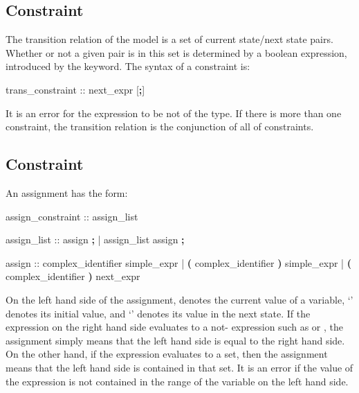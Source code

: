 \subsection{ Constraint}
\label{TRANS Constraint}
%
The transition relation of the model is a set of current state/next
state pairs. 
%
Whether or not a given pair is in this set is determined by a boolean
expression, introduced by the  keyword. 
%
The syntax of a  constraint is:
%
\begin{Grammar}
trans_constraint ::  next_expr [\textbf{;}]
\end{Grammar}
%
It is an error for the expression to be not of the \Boolean type.
%
If there is more than one  constraint, the transition
relation is the conjunction of all of  constraints.

\subsection{ Constraint}
\label{ASSIGN Constraint}
%
An assignment  has the form:
%
\begin{Grammar}
assign_constraint ::  assign_list

assign_list :: assign \textbf{;}
             | assign_list assign \textbf{;}

assign ::
    complex_identifier          \operator{:=} simple_expr
  |  \textbf{(} complex_identifier \textbf{)} \operator{:=} simple_expr
  |  \textbf{(} complex_identifier \textbf{)} \operator{:=} next_expr
\end{Grammar}
%
On the left hand side of the assignment,  denotes
the current value of a variable,
`{}' denotes its
initial value, and
`{}' denotes its
value in the next state.
%
If the expression on the right hand side evaluates to a not-\Set
expression such as  or , the assignment simply means that the left hand side is
equal to the right hand side.
%
On the other hand, if the expression evaluates to a set, then the
assignment means that the left hand side is contained in that set. 
%
It is an error if the value of the expression is not contained in the
range of the variable on the left hand side.

